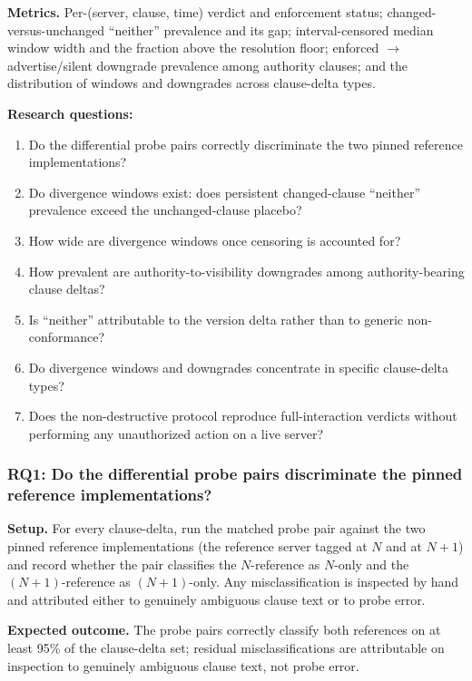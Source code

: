 \documentclass[11pt]{article}
\begin{document}
\textbf{Metrics.} Per-(server, clause, time) verdict and enforcement status; changed-versus-unchanged ``neither'' prevalence and its gap; interval-censored median window width and the fraction above the resolution floor; enforced $\to$ advertise/silent downgrade prevalence among authority clauses; and the distribution of windows and downgrades across clause-delta types.

\textbf{Research questions:}
\begin{enumerate}[leftmargin=1.9em,label=RQ\arabic*.]
\item Do the differential probe pairs correctly discriminate the two pinned reference implementations?
\item Do divergence windows exist: does persistent changed-clause ``neither'' prevalence exceed the unchanged-clause placebo?
\item How wide are divergence windows once censoring is accounted for?
\item How prevalent are authority-to-visibility downgrades among authority-bearing clause deltas?
\item Is ``neither'' attributable to the version delta rather than to generic non-conformance?
\item Do divergence windows and downgrades concentrate in specific clause-delta types?
\item Does the non-destructive protocol reproduce full-interaction verdicts without performing any unauthorized action on a live server?
\end{enumerate}

\subsubsection{RQ1: Do the differential probe pairs discriminate the pinned reference implementations?}

\textbf{Setup.} For every clause-delta, run the matched probe pair against the two pinned reference implementations (the reference server tagged at $N$ and at $N{+}1$) and record whether the pair classifies the $N$-reference as $N$-only and the $(N{+}1)$-reference as $(N{+}1)$-only. Any misclassification is inspected by hand and attributed either to genuinely ambiguous clause text or to probe error.

\textbf{Expected outcome.} The probe pairs correctly classify both references on at least 95\% of the clause-delta set; residual misclassifications are attributable on inspection to genuinely ambiguous clause text, not probe error.
\end{document}
